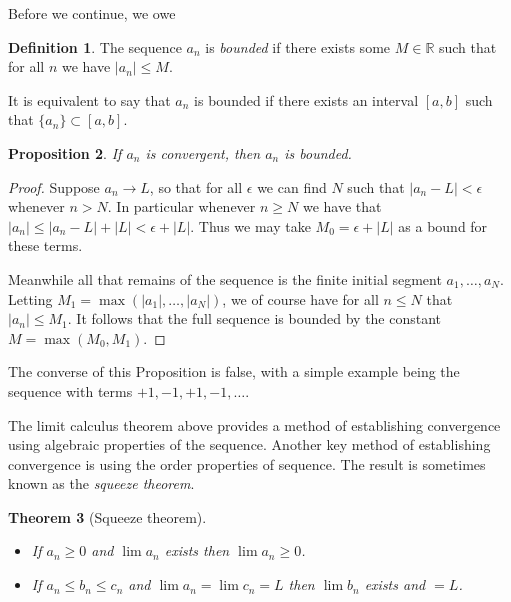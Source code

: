 \documentclass[11pt,oneside]{amsbook}
\newcommand{\R}{\mathbb R}
\theoremstyle{definition}
\theoremstyle{plain}
\newtheorem{theorem}{Theorem}[section]
\newtheorem{proposition}[theorem]{Proposition}
\theoremstyle{definition}
\newtheorem{definition}[theorem]{Definition}
\theoremstyle{remark}
\numberwithin{equation}{section}
\numberwithin{figure}{section}
\begin{document}
Before we continue, we owe

\begin{definition}
  The sequence $a_n$ is \emph{bounded} if there exists some $M\in\R$ such that for all $n$ we have $|a_n|\leq M$.
\end{definition}

It is equivalent to say that $a_n$ is bounded if there exists an interval $[a,b]$ such that $\{a_n\}\subset[a,b]$.

\begin{proposition}
  If $a_n$ is convergent, then $a_n$ is bounded.
\end{proposition}

\begin{proof}
  Suppose $a_n\to L$, so that for all $\epsilon$ we can find $N$ such that $|a_n-L|<\epsilon$ whenever $n>N$. In particular whenever $n\geq N$ we have that $|a_n|\leq|a_n-L|+|L|<\epsilon+|L|$. Thus we may take $M_0=\epsilon+|L|$ as a bound for these terms.

  Meanwhile all that remains of the sequence is the finite initial segment $a_1,\ldots,a_N$. Letting $M_1=\max(|a_1|,\ldots,|a_N|)$, we of course have for all $n\leq N$ that $|a_n|\leq M_1$. It follows that the full sequence is bounded by the constant $M=\max(M_0,M_1)$.
\end{proof}

The converse of this Proposition is false, with a simple example being the sequence with terms $+1,-1,+1,-1,\ldots$.

The limit calculus theorem above provides a method of establishing convergence using algebraic properties of the sequence. Another key method of establishing convergence is using the order properties of sequence. The result is sometimes known as the \emph{squeeze theorem}.

\begin{theorem}[Squeeze theorem]\
  \begin{itemize}
  \item If $a_n\geq0$ and $\lim a_n$ exists then $\lim a_n\geq0$.
  \item If $a_n\leq b_n\leq c_n$ and $\lim a_n=\lim c_n=L$ then $\lim b_n$ exists and $=L$.
  \end{itemize}
\end{theorem}
\end{document}
